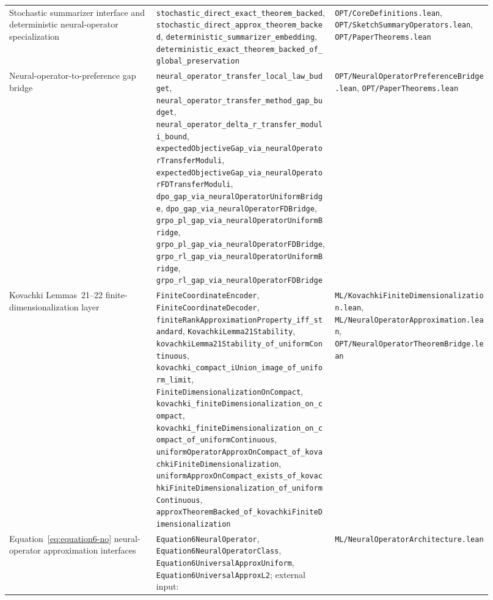 {\begin{longtable}{p{0.28\linewidth}p{0.34\linewidth}p{0.30\linewidth}}
Stochastic summarizer interface and deterministic neural-operator specialization &
\texttt{stochastic\_direct\_exact\_theorem\_backed}, \texttt{stochastic\_direct\_approx\_theorem\_backed}, \texttt{deterministic\_summarizer\_embedding}, \texttt{deterministic\_exact\_theorem\_backed\_of\_global\_preservation} &
\texttt{OPT/CoreDefinitions.lean}, \texttt{OPT/SketchSummaryOperators.lean}, \texttt{OPT/PaperTheorems.lean} \\

Neural-operator-to-preference gap bridge &
\texttt{neural\_operator\_transfer\_local\_law\_budget}, \texttt{neural\_operator\_transfer\_method\_gap\_budget}, \texttt{neural\_operator\_delta\_r\_transfer\_moduli\_bound}, \texttt{expectedObjectiveGap\_via\_neuralOperatorTransferModuli}, \texttt{expectedObjectiveGap\_via\_neuralOperatorFDTransferModuli}, \texttt{dpo\_gap\_via\_neuralOperatorUniformBridge}, \texttt{dpo\_gap\_via\_neuralOperatorFDBridge}, \texttt{grpo\_pl\_gap\_via\_neuralOperatorUniformBridge}, \texttt{grpo\_pl\_gap\_via\_neuralOperatorFDBridge}, \texttt{grpo\_rl\_gap\_via\_neuralOperatorUniformBridge}, \texttt{grpo\_rl\_gap\_via\_neuralOperatorFDBridge} &
\texttt{OPT/NeuralOperatorPreferenceBridge.lean}, \texttt{OPT/PaperTheorems.lean} \\

Kovachki Lemmas~21--22 finite-dimensionalization layer &
\texttt{FiniteCoordinateEncoder}, \texttt{FiniteCoordinateDecoder}, \texttt{finiteRankApproximationProperty\_iff\_standard}, \texttt{KovachkiLemma21Stability}, \texttt{kovachkiLemma21Stability\_of\_uniformContinuous}, \texttt{kovachki\_compact\_iUnion\_image\_of\_uniform\_limit}, \texttt{FiniteDimensionalizationOnCompact}, \texttt{kovachki\_finiteDimensionalization\_on\_compact}, \texttt{kovachki\_finiteDimensionalization\_on\_compact\_of\_uniformContinuous}, \texttt{uniformOperatorApproxOnCompact\_of\_kovachkiFiniteDimensionalization}, \texttt{uniformApproxOnCompact\_exists\_of\_kovachkiFiniteDimensionalization\_of\_uniformContinuous}, \texttt{approxTheoremBacked\_of\_kovachkiFiniteDimensionalization} &
\texttt{ML/KovachkiFiniteDimensionalization.lean}, \texttt{ML/NeuralOperatorApproximation.lean}, \texttt{OPT/NeuralOperatorTheoremBridge.lean} \\

Equation~\eqref{eq:equation6-no} neural-operator approximation interfaces &
\texttt{Equation6NeuralOperator}, \texttt{Equation6NeuralOperatorClass}, \texttt{Equation6UniversalApproxUniform}, \texttt{Equation6UniversalApproxL2}; external input: \citet[Theorems~11,13]{Kovachki23NeuralOperator} &
\texttt{ML/NeuralOperatorArchitecture.lean} \\


\end{longtable}}
